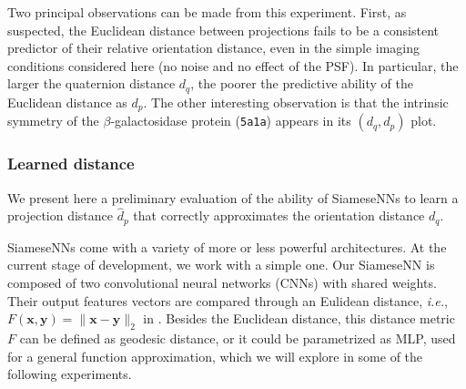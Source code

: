 Two principal observations can be made from this experiment.
First, as suspected, the Euclidean distance between projections fails to be a consistent predictor of their relative orientation distance, even in the simple imaging conditions considered here (no noise and no effect of the PSF).
In particular, the larger the quaternion distance $d_q$, the poorer the predictive ability of the Euclidean distance as $d_p$.
The other interesting observation is that the intrinsic symmetry of the $\beta$-galactosidase protein (\texttt{5a1a}) appears in its $(d_q,d_p)$ plot.

\subsubsection{Learned distance}\label{sec:results:distance-estimation:learned}



We present here a preliminary evaluation of the ability of SiameseNNs to learn a projection distance $\widehat{d}_p$ that correctly approximates the orientation distance $d_q$.

SiameseNNs come with a variety of more or less powerful architectures.
At the current stage of development, we work with a simple one.
Our SiameseNN is composed of two convolutional neural networks (CNNs) with shared weights.
Their output features vectors are compared through an Eulidean distance, \textit{i.e.}, $F(\mathbf{x},\mathbf{y})=\lVert \mathbf{x}-\mathbf{y}\rVert_2$ in .
Besides the Euclidean distance, this distance metric $F$ can be defined as geodesic distance, or it could be parametrized as MLP, used for a general function approximation, which we will explore in some of the following experiments.


